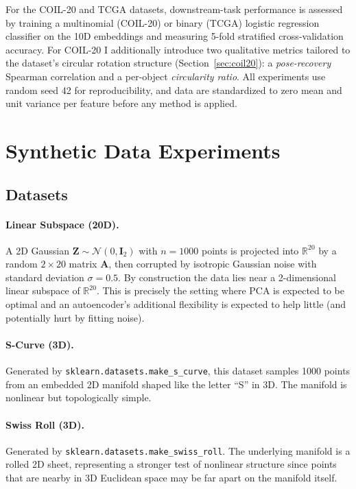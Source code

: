 \documentclass[11pt]{article}
\begin{document}
For the COIL-20 and TCGA datasets, downstream-task performance is assessed by training a multinomial (COIL-20) or binary (TCGA) logistic regression classifier on the 10D embeddings and measuring 5-fold stratified cross-validation accuracy. For COIL-20 I additionally introduce two qualitative metrics tailored to the dataset's circular rotation structure (Section~\ref{sec:coil20}): a \emph{pose-recovery} Spearman correlation and a per-object \emph{circularity ratio}. All experiments use random seed 42 for reproducibility, and data are standardized to zero mean and unit variance per feature before any method is applied.

\section{Synthetic Data Experiments}
\label{sec:synthetic}

\subsection{Datasets}

\paragraph{Linear Subspace (20D).} A 2D Gaussian $\mathbf{Z} \sim \mathcal{N}(0, \mathbf{I}_2)$ with $n = 1000$ points is projected into $\mathbb{R}^{20}$ by a random $2 \times 20$ matrix $\mathbf{A}$, then corrupted by isotropic Gaussian noise with standard deviation $\sigma = 0.5$. By construction the data lies near a 2-dimensional linear subspace of $\mathbb{R}^{20}$. This is precisely the setting where PCA is expected to be optimal and an autoencoder's additional flexibility is expected to help little (and potentially hurt by fitting noise).

\paragraph{S-Curve (3D).} Generated by \texttt{sklearn.datasets.make\_s\_curve}, this dataset samples 1000 points from an embedded 2D manifold shaped like the letter ``S'' in 3D. The manifold is nonlinear but topologically simple.

\paragraph{Swiss Roll (3D).} Generated by \texttt{sklearn.datasets.make\_swiss\_roll}. The underlying manifold is a rolled 2D sheet, representing a stronger test of nonlinear structure since points that are nearby in 3D Euclidean space may be far apart on the manifold itself.
\end{document}
